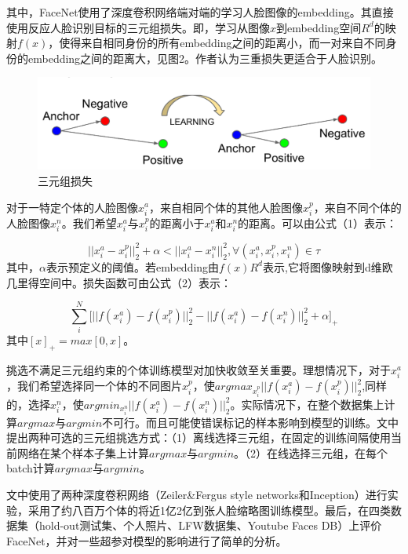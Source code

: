 \documentclass[a4paper]{article}
\begin{document}
    其中，FaceNet使用了深度卷积网络端对端的学习人脸图像的embedding。其直接使用反应人脸识别目标的三元组损失。即，学习从图像$x$到embedding空间$R^d$的映射$f(x)$，使得来自相同身份的所有embedding之间的距离小，而一对来自不同身份的embedding之间的距离大，见图2。作者认为三重损失更适合于人脸识别。

    \begin{figure}[H]
        \centering
        \includegraphics[width=0.9\linewidth]{./images/Triplet_loss_demo.png}
        \caption{三元组损失}
        \label{fig:triplet_loss_demo}
    \end{figure}

    对于一特定个体的人脸图像$x_i^a$，来自相同个体的其他人脸图像$x_i^p$，来自不同个体的人脸图像$x_i^n$。我们希望$x_i^a$与$x_i^p$的距离小于$x_i^a$和$x_i^n$的距离。可以由公式（1）表示：

    \begin{equation}
        ||x_i^a-x_i^p||_2^2 + \alpha < ||x_i^a-x_i^n||_2^2, \forall (x_i^a,x_i^p,x_i^n) \in \tau
    \end{equation}
    其中，$\alpha$表示预定义的阈值。若embedding由$f(x)R^d$表示,它将图像映射到d维欧几里得空间中。损失函数可由公式（2）表示：

    \begin{equation}
        \sum_i^N \big[ ||f(x_i^a)-f(x_i^p)||_2^2 - ||f(x_i^a) - f(x_i^n)||_2^2 + \alpha \big]_+
    \end{equation}
    其中$[x]_+=max[0,x]$。

    挑选不满足三元组约束的个体训练模型对加快收敛至关重要。理想情况下，对于$x_i^a$，我们希望选择同一个体的不同图片$x_i^p$，使$argmax_{x_i^p}||f(x_i^a)-f(x_i^p)||_2^2$,同样的，选择$x_i^n$，使$argmin_{x_i^n}||f(x_i^a)-f(x_i^n)||_2^2$。实际情况下，在整个数据集上计算$argmax$与$argmin$不可行。而且可能使错误标记的样本影响到模型的训练。文中提出两种可选的三元组挑选方式：（1）离线选择三元组，在固定的训练间隔使用当前网络在某个样本子集上计算$argmax$与$argmin$。（2）在线选择三元组，在每个batch计算$argmax$与$argmin$。

    文中使用了两种深度卷积网络（Zeiler\&Fergus style networks和Inception）进行实验，采用了约八百万个体的将近1亿2亿到张人脸缩略图训练模型。最后，在四类数据集（hold-out测试集、个人照片、LFW数据集、Youtube Faces DB）上评价FaceNet，并对一些超参对模型的影响进行了简单的分析。
    
\end{document}
